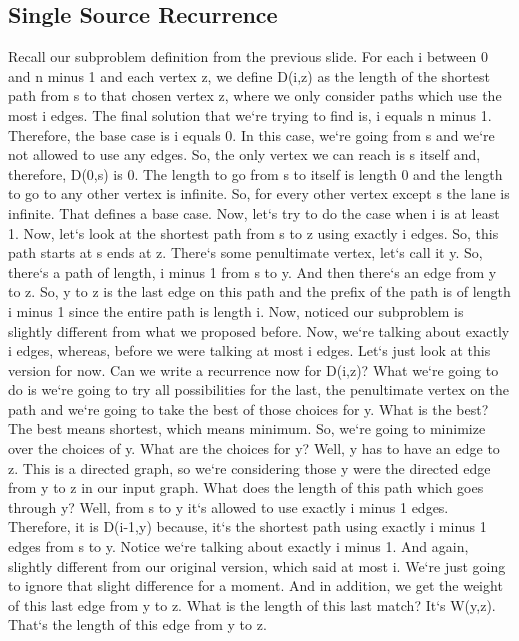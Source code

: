 \subsection{Single Source  Recurrence}
Recall our subproblem definition from the previous slide.
For each i between 0 and n minus 1 and each vertex z, we define D(i,z) as the length of the shortest path from s to that chosen vertex z, where we only consider paths which use the most i edges.
The final solution that we`re trying to find is, i equals n minus 1.
Therefore, the base case is i equals 0.
In this case, we`re going from s and we`re not allowed to use any edges.
So, the only vertex we can reach is s itself and, therefore, D(0,s) is 0.
The length to go from s to itself is length 0 and the length to go to any other vertex is infinite.
So, for every other vertex except s the lane is infinite.
That defines a base case.
Now, let`s try to do the case when i is at least 1.
Now, let`s look at the shortest path from s to z using exactly i edges.
So, this path starts at s ends at z.
There`s some penultimate vertex, let`s call it y.
So, there`s a path of length, i minus 1 from s to y.
And then there`s an edge from y to z.
So, y to z is the last edge on this path and the prefix of the path is of length i minus 1 since the entire path is length i.
Now, noticed our subproblem is slightly different from what we proposed before.
Now, we`re talking about exactly i edges, whereas, before we were talking at most i edges.
Let`s just look at this version for now.
Can we write a recurrence now for D(i,z)? What we`re going to do is we`re going to try all possibilities for the last, the penultimate vertex on the path and we`re going to take the best of those choices for y.
What is the best? The best means shortest, which means minimum.
So, we`re going to minimize over the choices of y.
What are the choices for y? Well, y has to have an edge to z.
This is a directed graph, so we`re considering those y were the directed edge from y to z in our input graph.
What does the length of this path which goes through y? Well, from s to y it`s allowed to use exactly i minus 1 edges.
Therefore, it is D(i-1,y) because, it`s the shortest path using exactly i minus 1 edges from s to y.
Notice we`re talking about exactly i minus 1.
And again, slightly different from our original version, which said at most i.
We`re just going to ignore that slight difference for a moment.
And in addition, we get the weight of this last edge from y to z.
What is the length of this last match? It`s W(y,z).
That`s the length of this edge from y to z.

